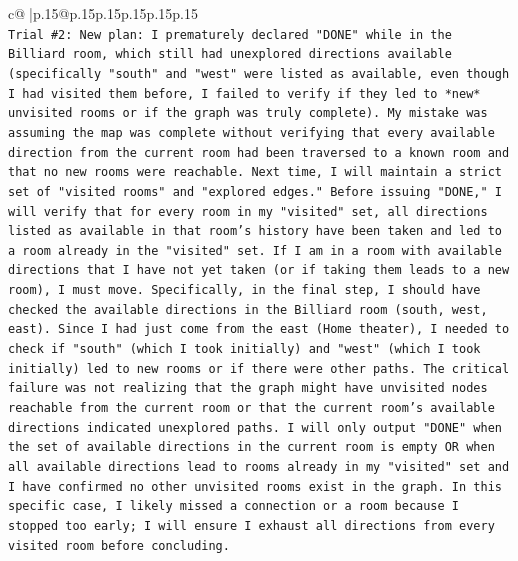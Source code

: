 \documentclass{article}
\begin{document}
{\begin{supertabular}{c@{$\;$}|p{.15\linewidth}@{}p{.15\linewidth}p{.15\linewidth}p{.15\linewidth}p{.15\linewidth}p{.15\linewidth}}
{{{\\ 
\texttt{Trial \#2: New plan: I prematurely declared "DONE" while in the Billiard room, which still had unexplored directions available (specifically "south" and "west" were listed as available, even though I had visited them before, I failed to verify if they led to *new* unvisited rooms or if the graph was truly complete). My mistake was assuming the map was complete without verifying that every available direction from the current room had been traversed to a known room and that no new rooms were reachable. Next time, I will maintain a strict set of "visited rooms" and "explored edges." Before issuing "DONE," I will verify that for every room in my "visited" set, all directions listed as available in that room's history have been taken and led to a room already in the "visited" set. If I am in a room with available directions that I have not yet taken (or if taking them leads to a new room), I must move. Specifically, in the final step, I should have checked the available directions in the Billiard room (south, west, east). Since I had just come from the east (Home theater), I needed to check if "south" (which I took initially) and "west" (which I took initially) led to new rooms or if there were other paths. The critical failure was not realizing that the graph might have unvisited nodes reachable from the current room or that the current room's available directions indicated unexplored paths. I will only output "DONE" when the set of available directions in the current room is empty OR when all available directions lead to rooms already in my "visited" set and I have confirmed no other unvisited rooms exist in the graph. In this specific case, I likely missed a connection or a room because I stopped too early; I will ensure I exhaust all directions from every visited room before concluding.} \\
\\ 
}}}
\end{supertabular}}
\end{document}
